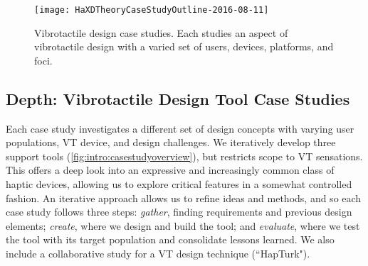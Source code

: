 \begin{figure}[htbp]
\begin{center}
\texttt{[image: HaXDTheoryCaseStudyOutline-2016-08-11]}
\caption{Vibrotactile design case studies. Each studies an aspect of vibrotactile design with a varied set of users, devices, platforms, and foci.}
\label{fig:intro:casestudyoverview}
\end{center}
\end{figure}



\subsection{Depth: Vibrotactile Design Tool Case Studies}

Each case study investigates a different set of design concepts with varying user populations, VT device, and design challenges.
We iteratively develop three \haxd support tools (\autoref{fig:intro:casestudyoverview}), but restricts scope to VT sensations.
This offers a deep look into an expressive and increasingly common class of haptic devices, allowing us to explore critical features in a somewhat controlled fashion.
An iterative approach allows us to refine ideas and methods, and so each case study follows three steps: \emph{gather}, finding requirements and previous design elements; \emph{create}, where we design and build the tool; and \emph{evaluate}, where we test the tool with its target population and consolidate lessons learned.
We also include a collaborative study for a VT design technique (``HapTurk").


